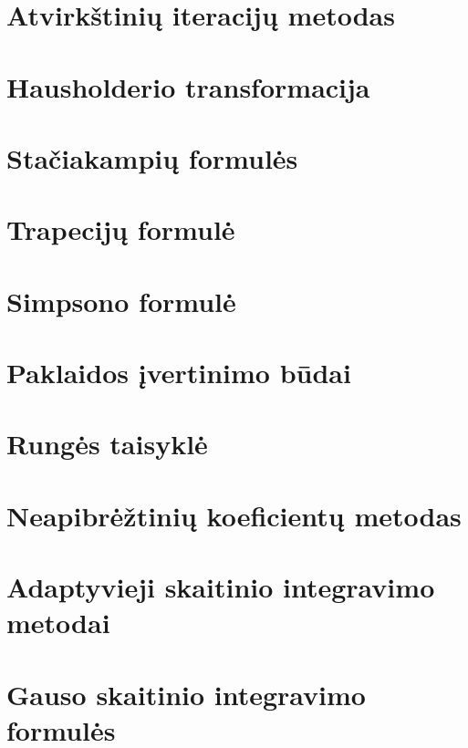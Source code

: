 \section{Atvirkštinių iteracijų metodas}
\cite[141-142,146-148]{textbook}
\section{Hausholderio transformacija}
\cite[148-151]{textbook}

\section{Stačiakampių formulės}
\cite[181-184]{textbook}
\section{Trapecijų formulė}
\cite[184-186]{textbook}
\section{Simpsono formulė}
\cite[187-188]{textbook}
\section{Paklaidos įvertinimo būdai}
\cite[189-191]{textbook}
\section{Rungės taisyklė}
\cite[190-192]{textbook}
\section{Neapibrėžtinių koeficientų metodas}
\cite[195-197]{textbook}
\section{Adaptyvieji skaitinio integravimo metodai}
\cite[193-194]{textbook}
\section{Gauso skaitinio integravimo formulės}
\cite[200-204]{textbook}


